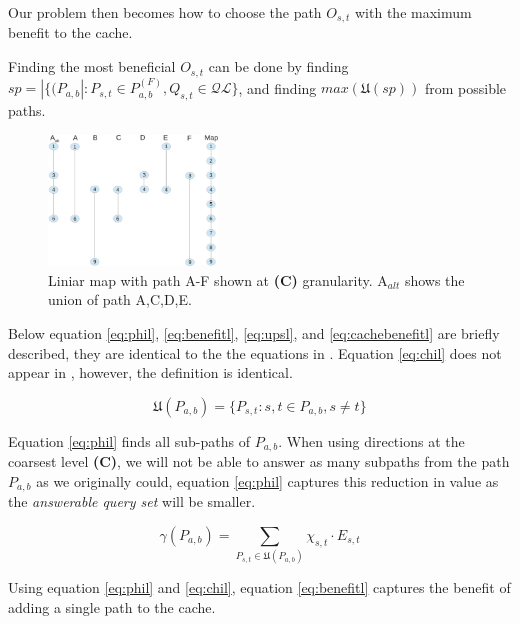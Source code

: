Our problem then becomes how to choose the path $O_{s,t}$ with the maximum benefit to the cache.

Finding the most beneficial $O_{s,t}$ can be done by finding  $sp = |\{(P_{a,b}| : P_{s,t} \in P^{(F)}_{a,b},  Q_{s,t} \in \mathcal{QL}\}$, and finding $max(\mathfrak{U}(sp))$ from possible paths.






\begin{figure}[hbt]
  \center
        \includegraphics[width=0.4\textwidth]{figures/altmap}
        \caption{Liniar map with path A-F shown at \textbf{(C)} granularity. A$_{alt}$ shows the union of path A,C,D,E.}
  \label{fig:altmap}
\end{figure}







Below equation \ref{eq:phil}, \ref{eq:benefitl}, \ref{eq:upsl}, and \ref{eq:cachebenefitl} are briefly described, they are identical to the the equations in \cite{thomsen2012}. Equation \ref{eq:chil} does not appear in \cite{thomsen2012}, however, the definition is identical.

\begin{equation} \label{eq:phil}
\mathfrak{U}(P_{a,b}) = \{ P_{s,t} : s, t \in P_{a,b},  s \neq t\}
\end{equation}

Equation \ref{eq:phil} finds all sub-paths of $P_{a,b}$. When using directions at the coarsest level \textbf{(C)},  we will not be able to answer as many subpaths from the path $P_{a,b}$ as we originally could, equation \ref{eq:phil} captures this reduction in value as the \textit{answerable query set} will be smaller.


\begin{equation} \label{eq:benefitl}
\gamma(P_{a,b}) = \sum\limits_{P_{s,t} \in \mathfrak{U}(P_{a,b})} \chi_{s,t} \cdot E_{s,t}
\end{equation}

Using equation \ref{eq:phil} and \ref{eq:chil}, equation \ref{eq:benefitl} captures the benefit of adding a single path to the cache.

